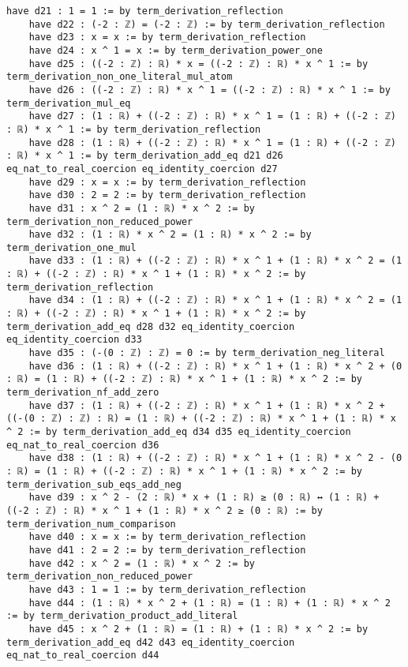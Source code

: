 \documentclass{article}
\begin{document}
\begin{tcolorbox}[colback=white!10, width=\linewidth]
\begin{lstlisting}[language=Lean4]
    have d21 : 1 = 1 := by term_derivation_reflection
    have d22 : (-2 : ℤ) = (-2 : ℤ) := by term_derivation_reflection
    have d23 : x = x := by term_derivation_reflection
    have d24 : x ^ 1 = x := by term_derivation_power_one
    have d25 : ((-2 : ℤ) : ℝ) * x = ((-2 : ℤ) : ℝ) * x ^ 1 := by term_derivation_non_one_literal_mul_atom
    have d26 : ((-2 : ℤ) : ℝ) * x ^ 1 = ((-2 : ℤ) : ℝ) * x ^ 1 := by term_derivation_mul_eq
    have d27 : (1 : ℝ) + ((-2 : ℤ) : ℝ) * x ^ 1 = (1 : ℝ) + ((-2 : ℤ) : ℝ) * x ^ 1 := by term_derivation_reflection
    have d28 : (1 : ℝ) + ((-2 : ℤ) : ℝ) * x ^ 1 = (1 : ℝ) + ((-2 : ℤ) : ℝ) * x ^ 1 := by term_derivation_add_eq d21 d26 eq_nat_to_real_coercion eq_identity_coercion d27
    have d29 : x = x := by term_derivation_reflection
    have d30 : 2 = 2 := by term_derivation_reflection
    have d31 : x ^ 2 = (1 : ℝ) * x ^ 2 := by term_derivation_non_reduced_power
    have d32 : (1 : ℝ) * x ^ 2 = (1 : ℝ) * x ^ 2 := by term_derivation_one_mul
    have d33 : (1 : ℝ) + ((-2 : ℤ) : ℝ) * x ^ 1 + (1 : ℝ) * x ^ 2 = (1 : ℝ) + ((-2 : ℤ) : ℝ) * x ^ 1 + (1 : ℝ) * x ^ 2 := by term_derivation_reflection
    have d34 : (1 : ℝ) + ((-2 : ℤ) : ℝ) * x ^ 1 + (1 : ℝ) * x ^ 2 = (1 : ℝ) + ((-2 : ℤ) : ℝ) * x ^ 1 + (1 : ℝ) * x ^ 2 := by term_derivation_add_eq d28 d32 eq_identity_coercion eq_identity_coercion d33
    have d35 : (-(0 : ℤ) : ℤ) = 0 := by term_derivation_neg_literal
    have d36 : (1 : ℝ) + ((-2 : ℤ) : ℝ) * x ^ 1 + (1 : ℝ) * x ^ 2 + (0 : ℝ) = (1 : ℝ) + ((-2 : ℤ) : ℝ) * x ^ 1 + (1 : ℝ) * x ^ 2 := by term_derivation_nf_add_zero
    have d37 : (1 : ℝ) + ((-2 : ℤ) : ℝ) * x ^ 1 + (1 : ℝ) * x ^ 2 + ((-(0 : ℤ) : ℤ) : ℝ) = (1 : ℝ) + ((-2 : ℤ) : ℝ) * x ^ 1 + (1 : ℝ) * x ^ 2 := by term_derivation_add_eq d34 d35 eq_identity_coercion eq_nat_to_real_coercion d36
    have d38 : (1 : ℝ) + ((-2 : ℤ) : ℝ) * x ^ 1 + (1 : ℝ) * x ^ 2 - (0 : ℝ) = (1 : ℝ) + ((-2 : ℤ) : ℝ) * x ^ 1 + (1 : ℝ) * x ^ 2 := by term_derivation_sub_eqs_add_neg
    have d39 : x ^ 2 - (2 : ℝ) * x + (1 : ℝ) ≥ (0 : ℝ) ↔ (1 : ℝ) + ((-2 : ℤ) : ℝ) * x ^ 1 + (1 : ℝ) * x ^ 2 ≥ (0 : ℝ) := by term_derivation_num_comparison
    have d40 : x = x := by term_derivation_reflection
    have d41 : 2 = 2 := by term_derivation_reflection
    have d42 : x ^ 2 = (1 : ℝ) * x ^ 2 := by term_derivation_non_reduced_power
    have d43 : 1 = 1 := by term_derivation_reflection
    have d44 : (1 : ℝ) * x ^ 2 + (1 : ℝ) = (1 : ℝ) + (1 : ℝ) * x ^ 2 := by term_derivation_product_add_literal
    have d45 : x ^ 2 + (1 : ℝ) = (1 : ℝ) + (1 : ℝ) * x ^ 2 := by term_derivation_add_eq d42 d43 eq_identity_coercion eq_nat_to_real_coercion d44

\end{lstlisting}
\end{tcolorbox}
\end{document}
